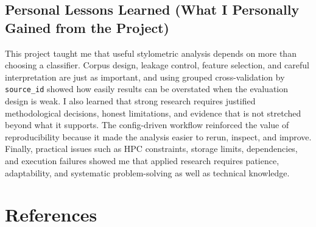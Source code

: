 \documentclass[12pt,a4paper]{article}
\begin{document}
\subsection{Personal Lessons Learned (What I Personally Gained from the Project)}

This project taught me that useful stylometric analysis depends on more than choosing a classifier. Corpus design, leakage control, feature selection, and careful interpretation are just as important, and using grouped cross-validation by \texttt{source\_id} showed how easily results can be overstated when the evaluation design is weak. I also learned that strong research requires justified methodological decisions, honest limitations, and evidence that is not stretched beyond what it supports. The config-driven workflow reinforced the value of reproducibility because it made the analysis easier to rerun, inspect, and improve. Finally, practical issues such as HPC constraints, storage limits, dependencies, and execution failures showed me that applied research requires patience, adaptability, and systematic problem-solving as well as technical knowledge.

\section{References}
\end{document}
